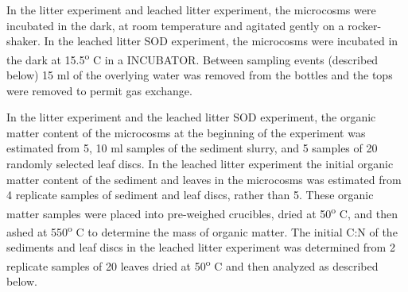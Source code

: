 In the litter experiment and leached litter experiment, the microcosms were incubated in the dark, at room temperature and agitated gently on a rocker-shaker. In the leached litter SOD experiment, the microcosms were incubated in the dark at 15.5\textsuperscript{o} C in a INCUBATOR.  Between sampling events (described below) 15 ml of the overlying water was removed from the bottles and the tops were removed to permit gas exchange.

In the litter experiment and the leached litter SOD experiment, the organic matter content of the microcosms at the beginning of the experiment was estimated from 5, 10 ml samples of the sediment slurry, and 5 samples of 20 randomly selected leaf discs. In the leached litter experiment the initial organic matter content of the sediment and leaves in the microcosms was estimated from 4 replicate samples of sediment and leaf discs, rather than 5. These organic matter samples were placed into pre-weighed crucibles, dried at 50\textsuperscript{o} C, and then ashed at 550\textsuperscript{o} C to determine the mass of organic matter. The initial C:N of the sediments and leaf discs in the leached litter experiment was determined from 2 replicate samples of 20 leaves dried at 50\textsuperscript{o} C and then analyzed as described below.